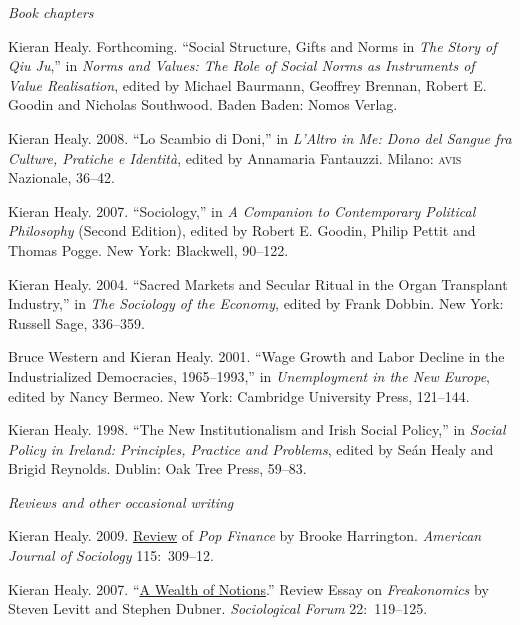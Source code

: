 \documentclass[11pt]{article}
\begin{document}
\noindent\emph{Book chapters \vspace{0.05in}}

\ind Kieran Healy. Forthcoming. ``Social Structure, Gifts and Norms in \emph{The Story of Qiu Ju},'' in \emph{Norms and Values: The Role of Social Norms as Instruments of Value Realisation}, edited by Michael Baurmann, Geoffrey Brennan, Robert E. Goodin and Nicholas Southwood. Baden Baden: Nomos Verlag.

\ind Kieran Healy. 2008. ``Lo Scambio di Doni,'' in \emph{L'Altro in Me: Dono del Sangue fra Culture, Pratiche e Identità}, edited by Annamaria Fantauzzi. Milano: \textsc{avis} Nazionale, 36--42. 

\ind Kieran Healy. 2007. ``Sociology,'' in \emph{A Companion to Contemporary Political Philosophy} (Second Edition), edited by Robert E. Goodin, Philip Pettit and Thomas Pogge. New York: Blackwell, 90--122. 

\ind  Kieran Healy. 2004. ``Sacred Markets and Secular Ritual in the Organ Transplant
Industry,'' in \emph{The Sociology of the Economy}, edited by Frank Dobbin. New
York: Russell Sage, 336--359.

\ind Bruce Western and Kieran Healy.  2001.  ``Wage Growth and Labor Decline in the
Industrialized Democracies, 1965--1993,'' in \emph{Unemployment in the New
  Europe}, edited by Nancy Bermeo. New York: Cambridge University Press,
121--144.

 \ind  Kieran Healy. 1998. ``The New Institutionalism and Irish Social Policy,'' in
\emph{Social Policy in Ireland: Principles, Practice and Problems}, edited by
Se\'{a}n Healy and Brigid Reynolds. Dublin: Oak Tree Press, 59--83.


\bigskip 
 
\noindent\emph{Reviews and other occasional writing \vspace{0.05in}}

\ind Kieran Healy. 2009. \href{http://www.journals.uchicago.edu/doi/pdf/10.1086/605757}{Review} of \emph{Pop Finance} by Brooke Harrington. \emph{American Journal of Sociology} 115:~309--12.

\ind Kieran Healy. 2007. ``\href{http://www.kieranhealy.org/files/reviews/socforum-article.pdf}{A Wealth of Notions}.'' Review
Essay on \emph{Freakonomics} by Steven Levitt and Stephen Dubner. \emph{Sociological Forum} 22:~119--125. 
\end{document}
